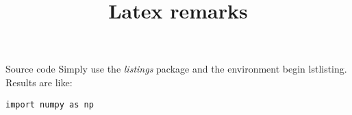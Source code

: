 \documentclass[10pt]{article}
\title {Latex remarks}
\begin{document}
\maketitle



\begin{section}{Source code}
Simply use the \emph{listings} package and the environment begin lstlisting.
Results are like:
\begin{lstlisting}
import numpy as np
\end{lstlisting}
\end{section}
\end{document}
